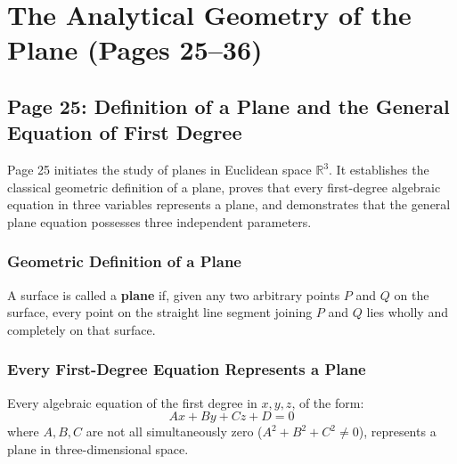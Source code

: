 \chapter{The Analytical Geometry of the Plane (Pages 25--36)}
\label{ch:the_plane}

\section{Page 25: Definition of a Plane and the General Equation of First Degree}
\label{sec:page25}

\begin{conceptbox}
Page 25 initiates the study of planes in Euclidean space $\mathbb{R}^3$. It establishes the classical geometric definition of a plane, proves that every first-degree algebraic equation in three variables represents a plane, and demonstrates that the general plane equation possesses three independent parameters.
\end{conceptbox}

\subsection{Geometric Definition of a Plane}
\begin{conceptbox}
A surface is called a \textbf{plane} if, given any two arbitrary points $P$ and $Q$ on the surface, every point on the straight line segment joining $P$ and $Q$ lies wholly and completely on that surface.
\end{conceptbox}

\subsection{Every First-Degree Equation Represents a Plane}
\begin{theorembox}
Every algebraic equation of the first degree in $x, y, z$, of the form:
\begin{equation}
    Ax + By + Cz + D = 0
\end{equation}
where $A, B, C$ are not all simultaneously zero ($A^2+B^2+C^2 \neq 0$), represents a plane in three-dimensional space.
\end{theorembox}

